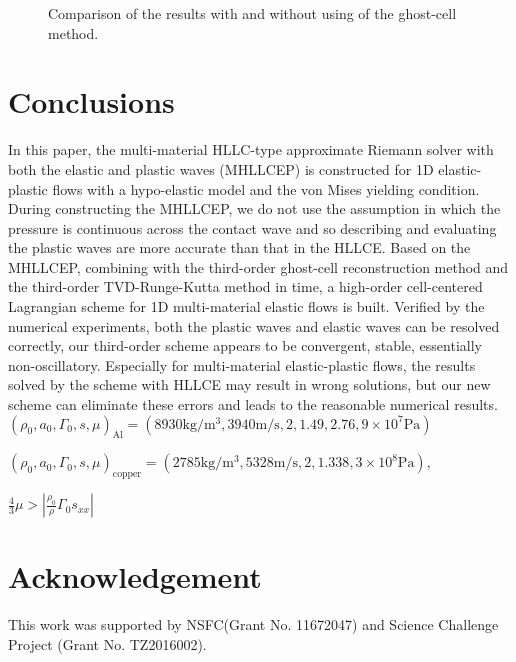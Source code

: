 \documentclass[review]{elsarticle}
\begin{document}
\begin{figure}

	  \caption{Comparison of the results with and without using of the ghost-cell method.}
      \label{fig:multi22}
    \end{figure}

%
\section*{Conclusions}
In this paper,  the multi-material HLLC-type  approximate Riemann solver with both the elastic and plastic waves (MHLLCEP) is constructed for 1D elastic-plastic  flows with a hypo-elastic model and the von Mises yielding condition. During constructing the  MHLLCEP, we do not use the assumption in which the pressure is continuous across the contact wave and so describing and evaluating the plastic waves are  more accurate than that in the  HLLCE.  Based on the MHLLCEP,
combining with the third-order ghost-cell reconstruction method and the third-order TVD-Runge-Kutta method in time, a high-order cell-centered Lagrangian scheme for 1D multi-material elastic flows is built. Verified by the numerical experiments, both the plastic waves and elastic waves can be resolved correctly, our third-order scheme appears to be convergent, stable, essentially non-oscillatory. Especially for multi-material elastic-plastic flows, the results solved by the scheme with HLLCE may result in wrong solutions, but our new scheme can eliminate these errors and leads to the reasonable numerical results.
$ (\rho_0, a_0, \Gamma_0, s, \mu)_{\text{Al}} =(8930 \text{kg}/\text{m}^3, 3940 \text{m}/\text{s},2, 1.49, 2.76 ,9\times 10^{7} \text{Pa} )$

 $(\rho_0, a_0, \Gamma_0, s, \mu)_{\text{copper}} =(2785 \text{kg}/\text{m}^3, 5328 \text{m}/\text{s},2, 1.338,3\times 10^{8}\text{Pa})$,


 $ \frac{4}{3}\mu > |\frac{\rho_0}{\rho}\Gamma_0s_{xx}|$
%
\section*{Acknowledgement}
This work was supported by NSFC(Grant No. 11672047) and Science Challenge Project (Grant No. TZ2016002).




\newpage
  \appendix
  \renewcommand{\appendixname}{Appendix~}
\end{document}
